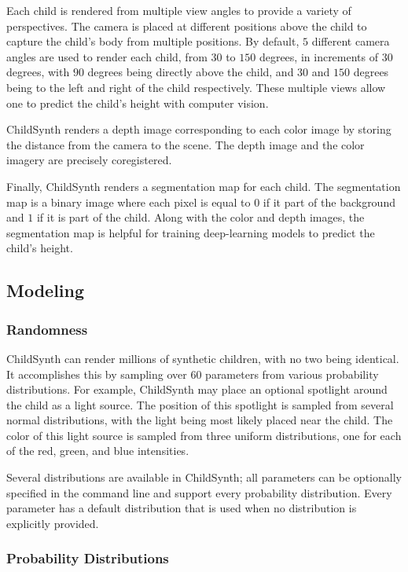 \documentclass{article}
\begin{document}
Each child is rendered from multiple view angles to provide a variety of perspectives. The camera is placed at different positions above the child to capture the child's body from multiple positions. By default, $5$ different camera angles are used to render each child, from $30$ to $150$ degrees, in increments of $30$ degrees, with $90$ degrees being directly above the child, and $30$ and $150$ degrees being to the left and right of the child respectively. These multiple views allow one to predict the child's height with computer vision.

ChildSynth renders a depth image corresponding to each color image by storing the distance from the camera to the scene. The depth image and the color imagery are precisely coregistered.

Finally, ChildSynth renders a segmentation map for each child. The segmentation map is a binary image where each pixel is equal to $0$ if it part of the background and $1$ if it is part of the child. Along with the color and depth images, the segmentation map is helpful for training deep-learning models to predict the child's height.


\subsection{Modeling}

\subsubsection{Randomness}

ChildSynth can render millions of synthetic children, with no two being identical.  It accomplishes this by sampling over $60$ parameters from various probability distributions. For example, ChildSynth may place an optional spotlight around the child as a light source. The position of this spotlight is sampled from several normal distributions, with the light being most likely placed near the child. The color of this light source is sampled from three uniform distributions, one for each of the red, green, and blue intensities. 

Several distributions are available in ChildSynth; all parameters can be optionally specified in the command line and support every probability distribution. Every parameter has a default distribution that is used when no distribution is explicitly provided.

\subsubsection{Probability Distributions}
\end{document}
